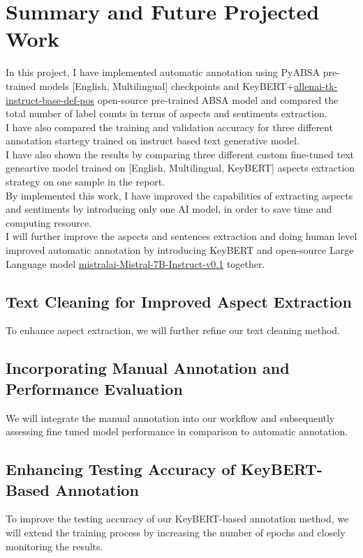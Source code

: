 \section{Summary and Future Projected Work}
In this project, I have implemented automatic annotation using PyABSA pre-trained models [English, Multilingual] checkpoints and KeyBERT+\href{https://huggingface.co/allenai/tk-instruct-base-def-pos}{allenai-tk-instruct-base-def-pos} open-source pre-trained ABSA model and compared the total number of label counts in terms of aspects and sentiments extraction.
\\
I have also compared the training and validation accuracy for three different annotation startegy trained on instruct based text generative model.
\\
I have also shown the results by comparing three different custom fine-tuned text geneartive model trained on [English, Multilingual, KeyBERT] aspects extraction strategy on one sample in the report.
\\
By implemented this work, I have improved the capabilities of extracting aspects and sentiments by introducing only one AI model, in order to save time and computing resource.
\\
I will further improve the aspects and sentences extraction and doing human level improved automatic annotation by introducing KeyBERT and open-source Large Language model \href{https://huggingface.co/mistralai/Mistral-7B-Instruct-v0.1}{mistralai-Mistral-7B-Instruct-v0.1} together.
\subsection{Text Cleaning for Improved Aspect Extraction}
To enhance aspect extraction, we will further refine our text cleaning method.
\subsection{Incorporating Manual Annotation and Performance Evaluation}
We will integrate the manual annotation into our workflow and subsequently assessing fine tuned model performance in comparison to automatic annotation.
\subsection{Enhancing Testing Accuracy of KeyBERT-Based Annotation}
To improve the testing accuracy of our KeyBERT-based annotation method, we will extend the training process by increasing the number of epochs and closely monitoring the results.
